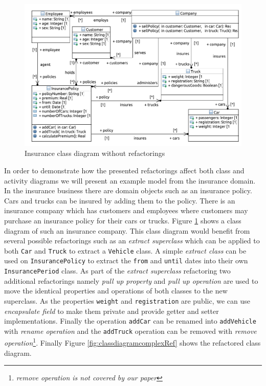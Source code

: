 \documentclass{llncs}
\begin{document}
\begin{figure}[h!t]
 \centering
 \includegraphics[scale=0.5]{images/insurance/Model_Model_ClassDiagram.PDF}
 \caption{Insurance class diagram without refactorings}
 \label{fig:classdiagramcomplex}
\end{figure}

In order to demonstrate how the presented refactorings affect both class and activity diagrams we will present an example 
model from the insurance domain. In the insurance business there are domain objects such as an insurance policy. Cars and 
trucks can be insured by adding them to the policy. There is an insurance company which has customers and employees where customers may purchase an insurance policy 
for their cars or trucks. Figure \ref{fig:classdiagramcomplex} shows a class diagram of such an insurance company. This class 
diagram would benefit from several possible refactorings such as an \textit{extract superclass} which can be applied to both \texttt{Car} 
and \texttt{Truck} to extract a \texttt{Vehicle} class. A simple \textit{extract class} can be used on \texttt{InsurancePolicy} to 
extract the \texttt{from} and \texttt{until} dates into their own \texttt{InsurancePeriod} class. As part of the 
\textit{extract superclass} refactoring two additional refactorings namely \textit{pull up property} and \textit{pull up operation} are 
used to move the identical properties and operations of both classes to the new superclass. As the 
properties \texttt{weight} and \texttt{registration} are public, we can use \textit{encapsulate field} to make them private and 
provide getter and setter implementations. Finally the operation \texttt{addCar} can be renamed into \texttt{addVehicle} with \textit{rename operation} 
and the \texttt{addTruck} operation can be removed with \textit{remove operation}\footnote{\textit{remove operation is not covered by our paper}}. Finally Figure \ref{fig:classdiagramcomplexRef} shows 
the refactored class diagram.
\end{document}
